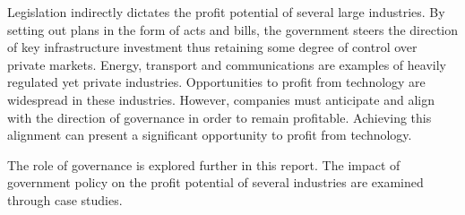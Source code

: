 Legislation indirectly dictates the profit potential of several large industries.
By setting out plans in the form of acts and bills, the government steers the direction of key infrastructure investment thus retaining some degree of control over private markets.
Energy, transport and communications are examples of heavily regulated yet private industries.
Opportunities to profit from technology are widespread in these industries.
However, companies must anticipate and align with the direction of governance in order to remain profitable.
Achieving this alignment can present a significant opportunity to profit from technology.

The role of governance is explored further in this report.
The impact of government policy on the profit potential of several industries are examined through case studies.







